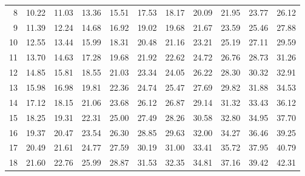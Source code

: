 \begin{center}
\begin{minipage}{5in}
\begin{center}
\begin{tabular}{|r|rrrrrrrrrr|}
\\\cellcolor{lightgray}	8	&\cellcolor{lightgray}	10.22	&\cellcolor{lightgray}	11.03	&\cellcolor{lightgray}	13.36	&\cellcolor{lightgray}	15.51	&\cellcolor{lightgray}	17.53	&\cellcolor{lightgray}	18.17	&\cellcolor{lightgray}	20.09	&\cellcolor{lightgray}	21.95	&\cellcolor{lightgray}	23.77	&\cellcolor{lightgray}	26.12
\\\cellcolor{lightgray}	9	&\cellcolor{lightgray}	11.39	&\cellcolor{lightgray}	12.24	&\cellcolor{lightgray}	14.68	&\cellcolor{lightgray}	16.92	&\cellcolor{lightgray}	19.02	&\cellcolor{lightgray}	19.68	&\cellcolor{lightgray}	21.67	&\cellcolor{lightgray}	23.59	&\cellcolor{lightgray}	25.46	&\cellcolor{lightgray}	27.88
\\\cellcolor{lightgray}	10	&\cellcolor{lightgray}	12.55	&\cellcolor{lightgray}	13.44	&\cellcolor{lightgray}	15.99	&\cellcolor{lightgray}	18.31	&\cellcolor{lightgray}	20.48	&\cellcolor{lightgray}	21.16	&\cellcolor{lightgray}	23.21	&\cellcolor{lightgray}	25.19	&\cellcolor{lightgray}	27.11	&\cellcolor{lightgray}	29.59
\\	11	&	13.70	&	14.63	&	17.28	&	19.68	&	21.92	&	22.62	&	24.72	&	26.76	&	28.73	&	31.26
\\	12	&	14.85	&	15.81	&	18.55	&	21.03	&	23.34	&	24.05	&	26.22	&	28.30	&	30.32	&	32.91
\\	13	&	15.98	&	16.98	&	19.81	&	22.36	&	24.74	&	25.47	&	27.69	&	29.82	&	31.88	&	34.53
\\	14	&	17.12	&	18.15	&	21.06	&	23.68	&	26.12	&	26.87	&	29.14	&	31.32	&	33.43	&	36.12
\\	15	&	18.25	&	19.31	&	22.31	&	25.00	&	27.49	&	28.26	&	30.58	&	32.80	&	34.95	&	37.70
\\\cellcolor{lightgray}	16	&\cellcolor{lightgray}	19.37	&\cellcolor{lightgray}	20.47	&\cellcolor{lightgray}	23.54	&\cellcolor{lightgray}	26.30	&\cellcolor{lightgray}	28.85	&\cellcolor{lightgray}	29.63	&\cellcolor{lightgray}	32.00	&\cellcolor{lightgray}	34.27	&\cellcolor{lightgray}	36.46	&\cellcolor{lightgray}	39.25
\\\cellcolor{lightgray}	17	&\cellcolor{lightgray}	20.49	&\cellcolor{lightgray}	21.61	&\cellcolor{lightgray}	24.77	&\cellcolor{lightgray}	27.59	&\cellcolor{lightgray}	30.19	&\cellcolor{lightgray}	31.00	&\cellcolor{lightgray}	33.41	&\cellcolor{lightgray}	35.72	&\cellcolor{lightgray}	37.95	&\cellcolor{lightgray}	40.79
\\\cellcolor{lightgray}	18	&\cellcolor{lightgray}	21.60	&\cellcolor{lightgray}	22.76	&\cellcolor{lightgray}	25.99	&\cellcolor{lightgray}	28.87	&\cellcolor{lightgray}	31.53	&\cellcolor{lightgray}	32.35	&\cellcolor{lightgray}	34.81	&\cellcolor{lightgray}	37.16	&\cellcolor{lightgray}	39.42	&\cellcolor{lightgray}	42.31

\end{tabular}
\end{center}
\end{minipage}
\end{center}
